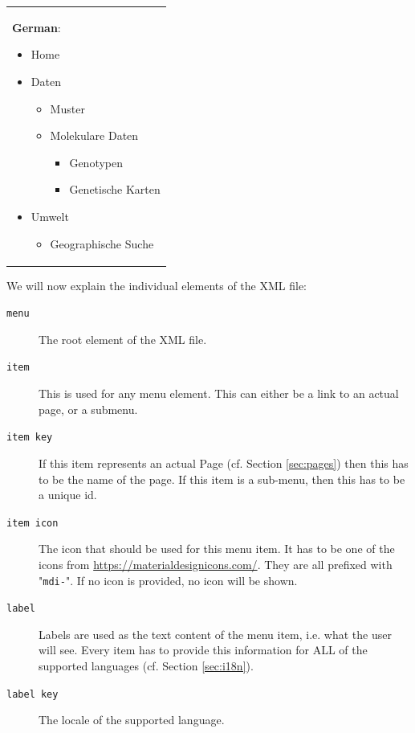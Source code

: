 \begin{tabular}[t]{@{}>{\raggedright\arraybackslash}p{}}
	\textbf{German}:
	\begin{itemize}
		\item Home
		\item Daten
		\begin{itemize}
			\item Muster
			\item Molekulare Daten
			\begin{itemize}
				\item Genotypen
				\item Genetische Karten
			\end{itemize}
		\end{itemize}
		\item Umwelt
		\begin{itemize}
			\item Geographische Suche
		\end{itemize}
	\end{itemize}
\end{tabular}
\noindent
We will now explain the individual elements of the XML file:
\begin{description}
	\item[\texttt{menu}] The root element of the XML file.
	\item[\texttt{item}] This is used for any menu element. This can either be a link to an actual page, or a submenu.
	\item[\texttt{item key}] If this item represents an actual {\germinate} Page (cf. Section \ref{sec:pages}) then this has to be the name of the page. If this item is a sub-menu, then this has to be a unique id.
	\item[\texttt{item icon}] The icon that should be used for this menu item. It has to be one of the icons from \url{https://materialdesignicons.com/}. They are all prefixed with "\texttt{mdi-}". If no icon is provided, no icon will be shown.
	\item[\texttt{label}] Labels are used as the text content of the menu item, i.e. what the user will see. Every item has to provide this information for ALL of the supported languages (cf. Section \ref{sec:i18n}).
	\item[\texttt{label key}] The locale of the supported language.
\end{description}